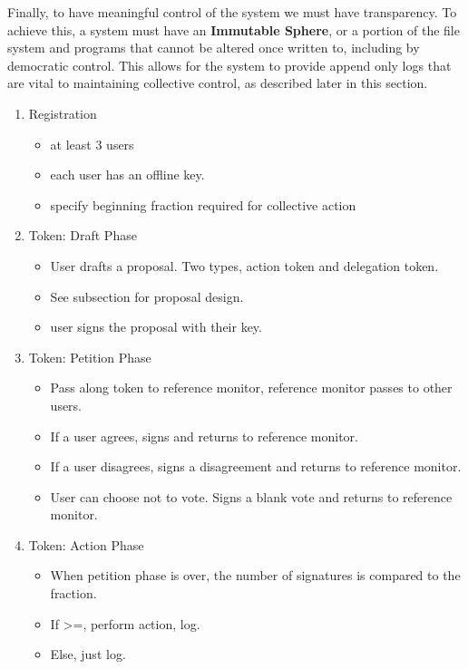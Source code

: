 Finally, to have meaningful control of the system we must have transparency. To
achieve this, a system must have an \textbf{Immutable Sphere}, or a portion of
the file system and programs that cannot be altered once written to, including
by democratic control. This allows for the system to provide append only logs
that are vital to maintaining collective control, as described later in this
section.

\begin{enumerate}
\item Registration
    \begin{itemize}
    \item at least 3 users
    \item each user has an offline key.
    \item specify beginning fraction required for collective action
    \end{itemize}
\item Token: Draft Phase
    \begin{itemize}
    \item User drafts a proposal. Two types, action token and delegation token.
    \item See subsection for proposal design.
    \item user signs the proposal with their key.
    \end{itemize}
\item Token: Petition Phase
    \begin{itemize}
    \item Pass along token to reference monitor, reference monitor passes to
    other users.
    \item If a user agrees, signs and returns to reference monitor.
    \item If a user disagrees, signs a disagreement and returns to reference
    monitor.
    \item User can choose not to vote. Signs a blank vote and returns to
    reference monitor.
    \end{itemize}
\item Token: Action Phase
    \begin{itemize}
    \item When petition phase is over, the number of signatures is compared to
    the fraction.
    \item If >=, perform action, log.
    \item Else, just log.
    \end{itemize}
\end{enumerate}

